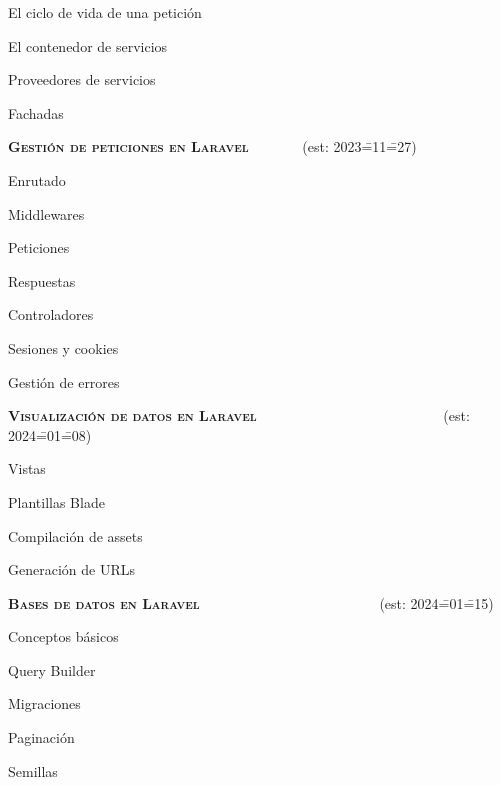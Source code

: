 \begin{longenum}
    \begin{longenum}
        \item El ciclo de vida de una petición
        \item El contenedor de servicios
        \item Proveedores de servicios
        \item Fachadas
    \end{longenum}
    \item \textbf{\textsc{Gestión de peticiones en Laravel}} \ \ \ \ \ \ \ (est: 2023\==11\==27)
    \begin{longenum}
        \item Enrutado
        \item Middlewares
        \item Peticiones
        \item Respuestas
        \item Controladores
        \item Sesiones y cookies
        \item Gestión de errores
    \end{longenum}
    \item \textbf{\textsc{Visualización de datos en Laravel}} \ \ \ \ \ \ \ \ \ \ \ \ \ \ \ \ \ \ \ \ \ \ \ \ \ \ (est: 2024\==01\==08)
    \begin{longenum}
        \item Vistas
        \item Plantillas Blade
        \item Compilación de assets
        \item Generación de URLs
    \end{longenum}
    \item \textbf{\textsc{Bases de datos en Laravel}} \ \ \ \ \ \ \ \ \ \ \ \ \ \ \ \ \ \ \ \ \ \ \ \ \ (est: 2024\==01\==15)
    \begin{longenum}
        \item Conceptos básicos
        \item Query Builder
        \item Migraciones
        \item Paginación
        \item Semillas

\end{longenum}
\end{longenum}
